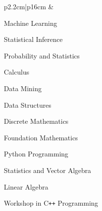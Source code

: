 \documentclass[10pt, oneside]{article}
\begin{document}
\begin{tabularx}{\linewidth}{p{2.2cm}|p{16cm}}
	&	\begin{itemize}
		\vspace{0.2cm}
			\begin{minipage}{0.3\linewidth}
				\item Machine Learning
				\item Statistical Inference
				\item Probability and Statistics
				\item Calculus
			\end{minipage}
			\begin{minipage}{0.3\linewidth}
				\item Data Mining
				\item Data Structures
				\item Discrete Mathematics
				\item Foundation Mathematics
			\end{minipage}
			\begin{minipage}{0.4\linewidth}
				\item Python Programming 
				\item Statistics and Vector Algebra
				\item Linear Algebra
				\item Workshop in C\texttt{++} Programming
			\end{minipage}
		\end{itemize}


\end{tabularx}
\end{document}
